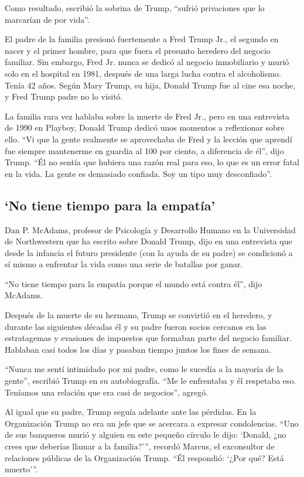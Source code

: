 Como resultado, escribió la sobrina de Trump, ``sufrió privaciones que
lo marcarían de por vida''.

El padre de la familia presionó fuertemente a Fred Trump Jr., el segundo
en nacer y el primer hombre, para que fuera el presunto heredero del
negocio familiar. Sin embargo, Fred Jr. nunca se dedicó al negocio
inmobiliario y murió solo en el hospital en 1981, después de una larga
lucha contra el alcoholismo. Tenía 42 años. Según Mary Trump, su hija,
Donald Trump fue al cine esa noche, y Fred Trump padre no lo visitó.

La familia rara vez hablaba sobre la muerte de Fred Jr., pero en una
entrevista de 1990 en Playboy, Donald Trump dedicó unos momentos a
reflexionar sobre ello. ``Vi que la gente realmente se aprovechaba de
Fred y la lección que aprendí fue siempre mantenerme en guardia al 100
por ciento, a diferencia de él'', dijo Trump. ``Él no sentía que hubiera
una razón real para eso, lo que es un error fatal en la vida. La gente
es demasiado confiada. Soy un tipo muy desconfiado''.

\hypertarget{no-tiene-tiempo-para-la-empatuxeda}{%
\subsection{`No tiene tiempo para la
empatía'}\label{no-tiene-tiempo-para-la-empatuxeda}}

Dan P. McAdams, profesor de Psicología y Desarrollo Humano en la
Universidad de Northwestern que ha escrito sobre Donald Trump, dijo en
una entrevista que desde la infancia el futuro presidente (con la ayuda
de su padre) se condicionó a sí mismo a enfrentar la vida como una serie
de batallas por ganar.

``No tiene tiempo para la empatía porque el mundo está contra él'', dijo
McAdams.

Después de la muerte de su hermano, Trump se convirtió en el heredero, y
durante las siguientes décadas él y su padre fueron socios cercanos en
las estratagemas y evasiones de impuestos que formaban parte del negocio
familiar. Hablaban casi todos los días y pasaban tiempo juntos los fines
de semana.

``Nunca me sentí intimidado por mi padre, como le sucedía a la mayoría
de la gente'', escribió Trump en su autobiografía. ``Me le enfrentaba y
él respetaba eso. Teníamos una relación que era casi de negocios'',
agregó.

Al igual que su padre, Trump seguía adelante ante las pérdidas. En la
Organización Trump no era un jefe que se acercara a expresar
condolencias. ``Uno de sus banqueros murió y alguien en este pequeño
círculo le dijo: `Donald, ¿no crees que deberías llamar a la
familia?''', recordó Marcus, el exconsultor de relaciones públicas de la
Organización Trump. ``Él respondió: `¿Por qué? Está muerto'''.

